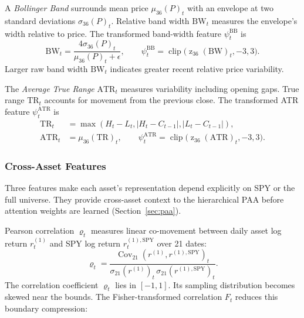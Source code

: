 A \emph{Bollinger Band} surrounds mean price \(\mu_{36}(P)_t\) with an envelope at two standard deviations \(\sigma_{36}(P)_t\). Relative band width \(\mathrm{BW}_t\) measures the envelope's width relative to price. The transformed band-width feature \(\psi_t^{\mathrm{BB}}\) is
\begin{equation}
\mathrm{BW}_t=\frac{4\sigma_{36}(P)_t}{\mu_{36}(P)_t+\epsilon},\qquad
\psi_t^{\mathrm{BB}}=\operatorname{clip}\big(\operatorname z_{36}(\mathrm{BW})_t,-3,3\big).
\label{eq:feature-bb}
\end{equation}
Larger raw band width \(\mathrm{BW}_t\) indicates greater recent relative price variability.

The \emph{Average True Range} \(\mathrm{ATR}_t\) measures variability including opening gaps. True range \(\mathrm{TR}_t\) accounts for movement from the previous close. The transformed ATR feature \(\psi_t^{\mathrm{ATR}}\) is
\begin{equation}
\begin{aligned}
\mathrm{TR}_t&=\max(H_t-L_t,|H_t-C_{t-1}|,|L_t-C_{t-1}|),\\
\mathrm{ATR}_t&=\mu_{36}(\mathrm{TR})_t,\qquad
\psi_t^{\mathrm{ATR}}=\operatorname{clip}\big(\operatorname z_{36}(\mathrm{ATR})_t,-3,3\big).
\end{aligned}
\label{eq:feature-atr}
\end{equation}

\subsubsection{Cross-Asset Features}

Three features make each asset's representation depend explicitly on SPY or the full universe. They provide cross-asset context to the hierarchical PAA before attention weights are learned (Section~\ref{sec:paa}).

Pearson correlation \(\varrho_t\) measures linear co-movement between daily asset log return \(r_t^{(1)}\) and SPY log return \(r_t^{(1),\mathrm{SPY}}\) over 21 dates:
\begin{equation}
\varrho_t=\frac{\operatorname{Cov}_{21}(r^{(1)},r^{(1),\mathrm{SPY}})_t}
{\sigma_{21}(r^{(1)})_t\,\sigma_{21}(r^{(1),\mathrm{SPY}})_t}.
\label{eq:feature-correlation}
\end{equation}
The correlation coefficient \(\varrho_t\) lies in \([-1,1]\). Its sampling distribution becomes skewed near the bounds. The Fisher-transformed correlation \(F_t\) reduces this boundary compression:

